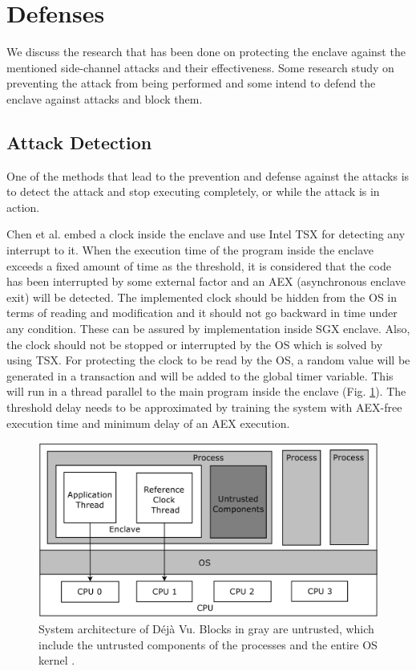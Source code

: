 \section{Defenses}
We discuss the research that has been done on protecting the enclave against the mentioned side-channel attacks and their effectiveness. Some research study on preventing the attack from being performed and some intend to defend the enclave against attacks and block them.

\subsection{Attack Detection}%
One of the methods that lead to the prevention and defense against the attacks is to detect the attack and stop executing completely, or while the attack is in action.

Chen et al. \cite{dejavu} embed a clock inside the enclave and use Intel TSX for detecting any interrupt to it. When the execution time of the program inside the enclave exceeds a fixed amount of time as the threshold, it is considered that the code has been interrupted by some external factor and an AEX (asynchronous enclave exit) will be detected. The implemented clock should be hidden from the OS in terms of reading and modification and it should not go backward in time under any condition. These can be assured by implementation inside SGX enclave. Also, the clock should not be stopped or interrupted by the OS which is solved by using TSX. For protecting the clock to be read by the OS, a random value will be generated in a transaction and will be added to the global timer variable. This will run in a thread parallel to the main program inside the enclave (Fig. \ref{fig:dejavu}). The threshold delay needs to be approximated by training the system with AEX-free execution time and minimum delay of an AEX execution.

\begin{figure}
	\includegraphics[scale=0.2]{images/dejavu}
	\caption{System architecture of Déjà Vu. Blocks in gray are untrusted, which include the untrusted components of the processes and the entire OS kernel \cite{dejavu}.}
	\label{fig:dejavu}
\end{figure}

